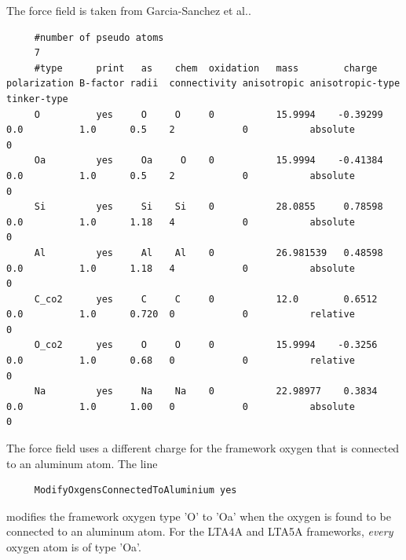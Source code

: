 \noindent
The force field is taken from Garcia-Sanchez et al.\cite{GarciaSanchez2009}.
\begin{tiny}
\begin{verbatim}
     #number of pseudo atoms
     7
     #type      print   as    chem  oxidation   mass        charge   polarization B-factor radii  connectivity anisotropic anisotropic-type   tinker-type
     O          yes     O     O     0           15.9994    -0.39299  0.0          1.0      0.5    2            0           absolute           0
     Oa         yes     Oa     O    0           15.9994    -0.41384  0.0          1.0      0.5    2            0           absolute           0
     Si         yes     Si    Si    0           28.0855     0.78598  0.0          1.0      1.18   4            0           absolute           0
     Al         yes     Al    Al    0           26.981539   0.48598  0.0          1.0      1.18   4            0           absolute           0
     C_co2      yes     C     C     0           12.0        0.6512   0.0          1.0      0.720  0            0           relative           0
     O_co2      yes     O     O     0           15.9994    -0.3256   0.0          1.0      0.68   0            0           relative           0
     Na         yes     Na    Na    0           22.98977    0.3834   0.0          1.0      1.00   0            0           absolute           0
\end{verbatim}
\end{tiny}
The force field uses a different charge for the framework oxygen that is connected to an aluminum atom.
The line
\begin{tiny}
\begin{verbatim}
     ModifyOxgensConnectedToAluminium yes
\end{verbatim}
\end{tiny}
modifies the framework oxygen type 'O' to 'Oa' when the oxygen is found to be connected to an aluminum atom.
For the LTA4A and LTA5A frameworks, \emph{every} oxygen atom is of type 'Oa'.

